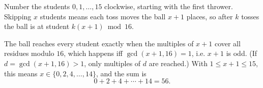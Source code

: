 Number the students \(0,1,\dots,15\) clockwise, starting with the first thrower. Skipping \(x\) students means each toss moves the ball \(x+1\) places, so after \(k\) tosses the ball is at student \(k(x+1)\bmod16\).

The ball reaches every student exactly when the multiples of \(x+1\) cover all residues modulo \(16\), which happens iff \(\gcd(x+1,16)=1\), i.e. \(x+1\) is odd. (If \(d=\gcd(x+1,16)>1\), only multiples of \(d\) are reached.) With \(1\le x+1\le15\), this means \(x\in\{0,2,4,\dots,14\}\), and the sum is
\[
0+2+4+\cdots+14=\boxed{56}.
\]
